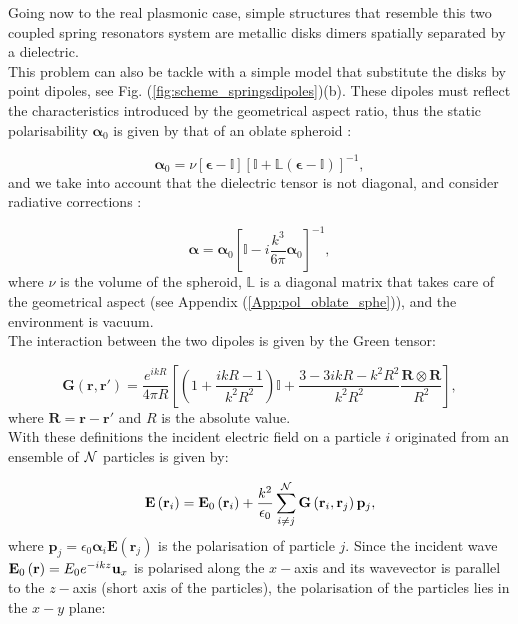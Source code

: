 Going now to the real plasmonic case, simple structures that resemble this two coupled spring resonators system are metallic disks dimers spatially separated by a dielectric.\\
This problem can also be tackle with a simple model that substitute the disks by point dipoles, see Fig. (\ref{fig:scheme_springsdipoles})(b). These dipoles must reflect the characteristics introduced by the geometrical aspect ratio, thus the static polarisability $\boldsymbol{\alpha}_{0}$ is given by that of an oblate spheroid \cite{bohren2008absorption}:

\begin{equation}
\boldsymbol{\alpha}_{0} = \nu \left[\boldsymbol{\epsilon}-\mathbb{I}\right]\left[\mathbb{I}+\mathbb{L}\left(\boldsymbol{\epsilon - \mathbb{I}}\right)\right]^{-1}, \label{eq:chap3_polarizability}
\end{equation}
 and we take into account that the dielectric tensor is not diagonal, and consider radiative corrections \cite{albaladejo2010radiative}:

\begin{equation}
\boldsymbol{\alpha} = \boldsymbol{\alpha}_{0}\left[\mathbb{I}-i\frac{k^3}{6\pi}\boldsymbol{\alpha}_{0}\right]^{-1},\label{eq:chap3_radiative_correction}
\end{equation}
where $\nu$ is the volume of the spheroid, $\mathbb{L}$ is a diagonal matrix that takes care of the geometrical aspect (see Appendix (\ref{App:pol_oblate_sphe})), and the environment is vacuum.\\
The interaction between the two dipoles is given by the Green tensor:

\begin{equation}
\mathbf{G}\left(\mathbf{r},\mathbf{r}'\right) = \frac{e^{ikR}}{4\pi R}\left[\left(1+\frac{ikR-1}{k^2R^2}\right)\mathbb{I}+\frac{3-3ikR-k^2R^2}{k^2R^2}\frac{\mathbf{R} \otimes\mathbf{R}}{R^2}\right],\label{chap3_Green_tensor}
\end{equation}
where $\mathbf{R} = \mathbf{r} - \mathbf{r}'$ and $R$ is the absolute value. \\
With these definitions the incident electric field on a particle $i$ originated from an ensemble of ${\cal{N}}$ particles is given by:

\begin{equation}
\mathbf{E}\left(\mathbf{r}_i\right) = \mathbf{E}_{0}\left(\mathbf{r}_i\right) + \frac{k^2}{\epsilon_{0}}\sum_{i \neq j}^{\cal{N}}\mathbf{G}\left(\mathbf{r}_i,\mathbf{r}_j\right) \mathbf{p}_j,
\end{equation}
where $\mathbf{p}_j = \epsilon_{0}\boldsymbol{\alpha}_i\mathbf{E}\left(\mathbf{r}_j\right)$ is the polarisation of particle $j$. Since the incident wave $\mathbf{E}_{0}\left(\bold{r}\right)=E_{0}e^{-ikz}\bold{u}_x$ is polarised along the $x-$axis and its wavevector is parallel to the $z-$axis (short axis of the particles), the polarisation of the particles lies in the $x-y$ plane:

